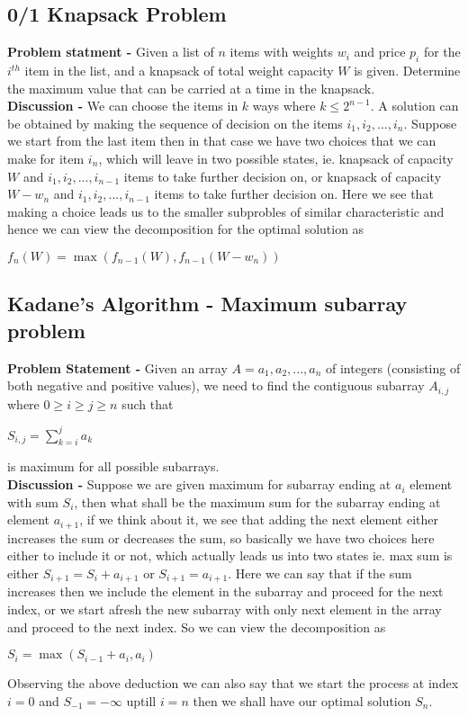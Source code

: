\documentclass[10pt,a4paper,draft]{article}
\begin{document}
\subsection{0/1 Knapsack Problem}
\textbf{Problem statment -} Given a list of $n$ items with weights $w_i$ and price $p_i$ for the $i^{th}$ item in the list, and a knapsack of total weight capacity $W$ is given. Determine the maximum value that can be carried at a time in the knapsack.
\\[12pt]
\textbf{Discussion -} We can choose the items in $k$ ways where $k \leq 2^{n-1}$. A solution can be obtained by making the sequence of decision on the items $i_1,i_2,...,i_n$. Suppose we start from the last item then in that case we have two choices that we can make for item $i_n$, which will leave in two possible states, ie. knapsack of capacity $W$ and $i_1,i_2,...,i_{n-1}$ items to take further decision on, or knapsack of capacity $W-w_n$ and $i_1,i_2,...,i_{n-1}$ items to take further decision on. Here we see that making a choice leads us to the smaller subprobles of similar characteristic and hence we can view the decomposition for the optimal solution as
\begin{center}
$f_n(W) = \max(f_{n-1}(W),f_{n-1}(W-w_n))$
\end{center}
\subsection{Kadane's Algorithm - Maximum subarray problem}
\textbf{Problem Statement -} Given an array $A = {a_1,a_2,...,a_n}$ of integers (consisting of both negative and positive values), we need to find the contiguous subarray $A_{i,j}$ where $0 \geq i \geq j \geq n$ such that
\begin{center}
$S_{i,j} = \sum\limits_{k=i}^ja_k$
\end{center}
is maximum for all possible subarrays.
\\[12pt]
\textbf{Discussion -} Suppose we are given maximum for subarray ending at $a_i$ element with sum $S_i$, then what shall be the maximum sum for the subarray ending at element $a_{i+1}$, if we think about it, we see that adding the next element either increases the sum or decreases the sum, so basically we have two choices here either to include it or not, which actually leads us into two states ie. max sum is either $S_{i+1} = S_i + a_{i+1}$ or $S_{i+1} = a_{i+1}$. Here we can say that if the sum increases then we include the element in the subarray and proceed for the next index, or we start afresh the new subarray with only next element in the array and proceed to the next index. So we can view the decomposition as
\begin{center}
$S_i = \max(S_{i-1}+ a_i,a_i)$
\end{center}
Observing the above deduction we can also say that we start the process at index $i=0$ and $S_{-1} = -\infty$ uptill $i = n$ then we shall have our optimal solution $S_n$.
\end{document}
